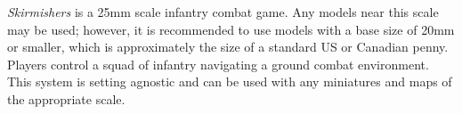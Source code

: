 \emph{Skirmishers} is a 25mm scale infantry combat game.
Any models near this scale may be used; however, it is recommended to use models with a base size of 20mm or smaller, which is approximately the size of a standard US or Canadian penny.
Players control a squad of infantry navigating a ground combat environment.
This system is setting agnostic and can be used with any miniatures and maps of the appropriate scale.
